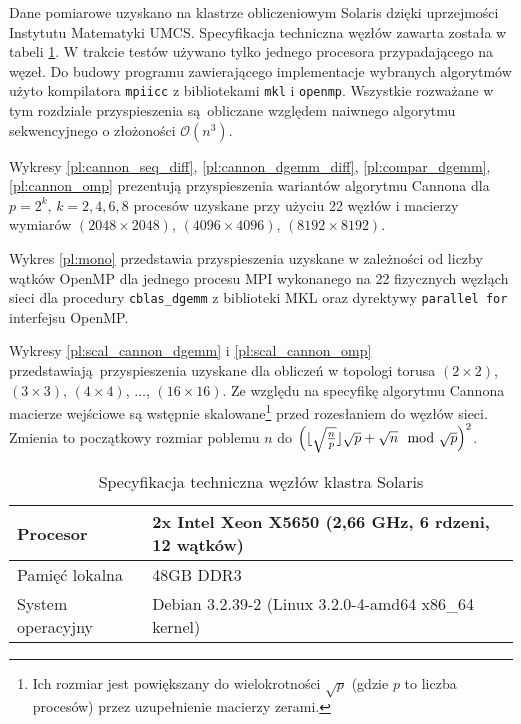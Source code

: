 Dane pomiarowe uzyskano na klastrze obliczeniowym Solaris dzięki uprzejmości Instytutu Matematyki UMCS. Specyfikacja techniczna węzłów zawarta została w tabeli \ref{tab:specs}. W trakcie testów używano tylko jednego procesora przypadającego na węzeł. Do budowy programu zawierającego implementacje wybranych algorytmów użyto kompilatora \texttt{mpiicc} z bibliotekami \texttt{mkl} i \texttt{openmp}. Wszystkie rozważane w tym rozdziale przyspieszenia są obliczane względem naiwnego algorytmu sekwencyjnego o złożoności \(\mathcal{O}(n^3)\).


Wykresy \ref{pl:cannon_seq_diff}, \ref{pl:cannon_dgemm_diff}, \ref{pl:compar_dgemm}, \ref{pl:cannon_omp} prezentują przyspieszenia wariantów algorytmu Cannona dla \(p=2^k,\,k=2,4,6,8\) procesów uzyskane przy użyciu 22 węzłów i macierzy wymiarów \((2048\times 2048)\), \((4096\times 4096)\), \((8192\times 8192)\).


Wykres \ref{pl:mono} przedstawia przyspieszenia uzyskane w zależności od liczby wątków OpenMP dla jednego procesu MPI wykonanego na 22 fizycznych węzłąch sieci dla procedury \texttt{cblas\_dgemm} z biblioteki MKL oraz dyrektywy \texttt{parallel for} interfejsu OpenMP.



Wykresy \ref{pl:scal_cannon_dgemm} i \ref{pl:scal_cannon_omp} przedstawiają przyspieszenia uzyskane dla obliczeń w topologi torusa \((2\times 2)\), \((3\times 3)\), \((4\times 4)\), \(\dots\), \((16\times 16)\). Ze względu na specyfikę algorytmu Cannona macierze wejściowe są wstępnie skalowane\footnote{Ich rozmiar jest powiększany do wielokrotności \(\sqrt{p}\) (gdzie \(p\) to liczba procesów) przez uzupełnienie macierzy zerami.} przed rozesłaniem do węzłów sieci. Zmienia to początkowy rozmiar poblemu \(n\) do \(\left( \lfloor \sqrt{\frac{n}{p}} \rfloor \sqrt{p} + \sqrt{n}\mod{\sqrt{p}}\right)^2\).

\begin{table}[H]
\begin{tabular}{|l|l|}
\hline
Procesor & 2x Intel Xeon X5650 (2,66 GHz, 6 rdzeni, 12 wątków) \\
\hline
Pamięć lokalna & 48GB DDR3 \\
\hline
System operacyjny & Debian 3.2.39-2 (Linux 3.2.0-4-amd64 x86\_64 kernel)\\
\hline
\end{tabular}
\caption{Specyfikacja techniczna węzłów klastra Solaris}
\label{tab:specs}
\end{table}


